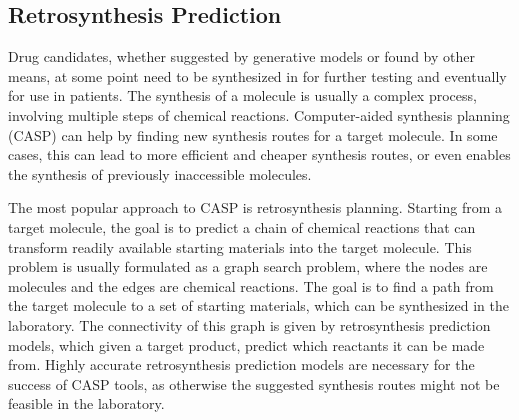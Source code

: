 

\subsection{Retrosynthesis Prediction\label{sec:retrosynthesis}}
Drug candidates, whether suggested by generative models or found by other means,
at some point need to be synthesized in for further testing and 
eventually for use in patients. The synthesis of a molecule is usually a complex
process, involving multiple steps of chemical reactions. Computer-aided synthesis 
planning (CASP) can help by finding new synthesis routes for a target molecule.
In some cases, this can lead to more efficient and cheaper synthesis routes, or
even enables the synthesis of previously inaccessible molecules.

The most popular approach to CASP is retrosynthesis planning. Starting from a
target molecule, the goal is to predict a chain of chemical reactions that can
transform readily available starting materials into the target molecule. This
problem is usually formulated as a graph search problem, where the nodes are
molecules and the edges are chemical reactions. The goal is to find a path from
the target molecule to a set of starting materials, which can be synthesized in
the laboratory. The connectivity of this graph is given by retrosynthesis
prediction models, which given a target product, predict which reactants it can
be made from. Highly accurate retrosynthesis prediction models are necessary for
the success of CASP tools, as otherwise the suggested synthesis routes might not
be feasible in the laboratory.

